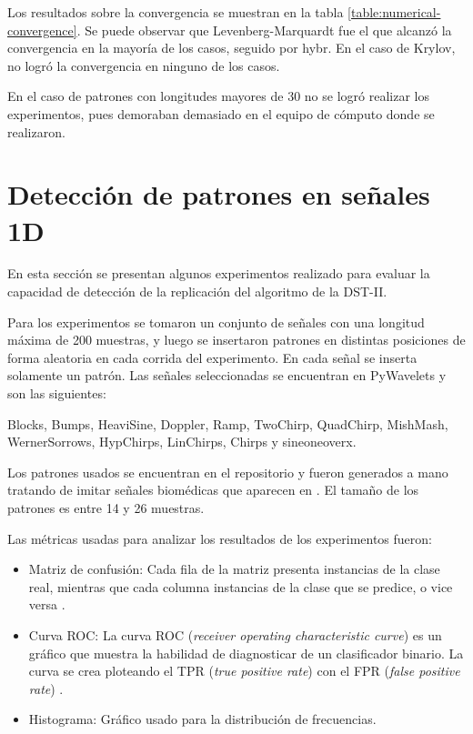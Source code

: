 Los resultados sobre la convergencia se muestran en la tabla \ref{table:numerical-convergence}. Se puede
observar que Levenberg-Marquardt fue el que alcanzó la convergencia en la mayoría de los casos, seguido 
por hybr. En el caso de Krylov, no logró la convergencia en ninguno de los casos.

En el caso de patrones con longitudes mayores de 30 no se logró realizar los experimentos, pues demoraban demasiado
en el equipo de cómputo donde se realizaron.

\section{Detección de patrones en señales 1D}

En esta sección se presentan algunos experimentos realizado para evaluar la capacidad  de detección de la replicación
del algoritmo de la DST-II.

Para los experimentos se tomaron un conjunto de señales con una longitud máxima de 200 muestras, y luego
se insertaron patrones en distintas posiciones de forma aleatoria en cada corrida del experimento. En cada señal 
se inserta solamente un patrón. Las señales seleccionadas se encuentran en PyWavelets
y son las siguientes:

Blocks, Bumps, HeaviSine, Doppler, Ramp, TwoChirp, QuadChirp, MishMash, WernerSorrows, HypChirps, LinChirps, Chirps y sineoneoverx.

Los patrones usados se encuentran en el repositorio y fueron generados a mano tratando de imitar señales biomédicas que
aparecen en \cite{Guido2018}. El tamaño de los patrones es entre 14 y 26 muestras.

Las métricas usadas para analizar los resultados de los experimentos fueron:

\begin{itemize}
	\item Matriz de confusión: Cada fila de la matriz presenta instancias de la clase real, mientras que cada columna instancias
		de la clase que se predice, o vice versa \cite{CIFUENTES2010}.
	\item Curva ROC: La curva ROC (\textit{receiver operating characteristic curve}) es un gráfico que muestra la habilidad de diagnosticar
		de un clasificador binario. La curva se crea ploteando el TPR (\textit{true positive rate}) con el FPR (\textit{false positive rate})
		\cite{CERDA2012}.
	\item Histograma: Gráfico usado para la distribución de frecuencias. 
\end{itemize}

